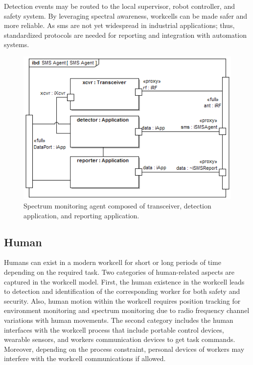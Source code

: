 Detection events may be routed to the local supervisor, robot controller, and safety system.  By leveraging spectral awareness, workcells can be made safer and more reliable.  As \gls{sms} are not yet widespread in industrial applications; thus, standardized protocols are needed for reporting and integration with automation systems.

\begin{figure}[tbp]
	\centering
	\includegraphics[width=0.99\columnwidth]{./chapter-sysml/diagrams/ibd__SMS_Agent__SMS_Agent}
	\caption{Spectrum monitoring agent composed of transceiver, detection application, and reporting application.}
	\label{sysml:fig:sms:bdd}
\end{figure}

\subsection{Human}\label{sysml:sec:human}

Humans can exist in a modern workcell for short or long periods of time depending on the required task. Two categories of human-related aspects are captured in the workcell model. First, the human existence in the workcell leads to detection and identification of the corresponding worker for both safety and security. Also, human motion within the workcell requires position tracking for environment monitoring and spectrum monitoring due to radio frequency channel variations with human movements. The second category includes the human interfaces with the workcell process that include portable control devices, wearable sensors, and workers communication devices to get task commands. Moreover, depending on the process constraint, personal devices of workers may interfere with the workcell communications if allowed.

